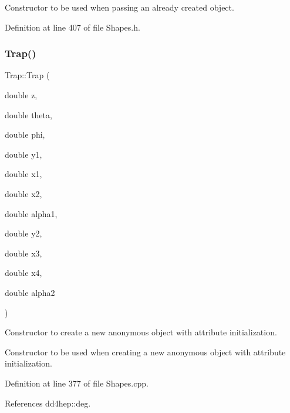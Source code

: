 Constructor to be used when passing an already created object. 



Definition at line 407 of file Shapes.\+h.

\hypertarget{class_d_d4hep_1_1_geometry_1_1_trap_a94f6d7bb5674a6d9f885fd0a90f0afe7}{}\label{class_d_d4hep_1_1_geometry_1_1_trap_a94f6d7bb5674a6d9f885fd0a90f0afe7} 
\subsubsection{\texorpdfstring{Trap()}{Trap()}\hspace{0.1cm}{\footnotesize\ttfamily [5/7]}}
{\footnotesize\ttfamily Trap\+::\+Trap (\begin{DoxyParamCaption}\item[{double}]{z,  }\item[{double}]{theta,  }\item[{double}]{phi,  }\item[{double}]{y1,  }\item[{double}]{x1,  }\item[{double}]{x2,  }\item[{double}]{alpha1,  }\item[{double}]{y2,  }\item[{double}]{x3,  }\item[{double}]{x4,  }\item[{double}]{alpha2 }\end{DoxyParamCaption})}



Constructor to create a new anonymous object with attribute initialization. 

Constructor to be used when creating a new anonymous object with attribute initialization. 

Definition at line 377 of file Shapes.\+cpp.



References dd4hep\+::deg.

\hypertarget{class_d_d4hep_1_1_geometry_1_1_trap_aaefea9c824b382d67d0b5d6b3fe3f62d}{}\label{class_d_d4hep_1_1_geometry_1_1_trap_aaefea9c824b382d67d0b5d6b3fe3f62d} 
